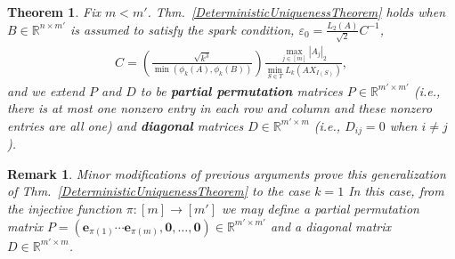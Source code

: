 \documentclass[journal, twocolumn]{IEEEtran}
\newtheorem{theorem}{Theorem}
\newtheorem{remark}{Remark}
\begin{document}
\begin{theorem}\label{DeterministicUniquenessTheorem2}
Fix $m < m'$.  Thm.~\ref{DeterministicUniquenessTheorem} holds when $B \in \mathbb{R}^{n \times m'}$ is assumed to satisfy the spark condition, $\varepsilon_0 = \frac{L_2(A)}{\sqrt{2}}  C^{-1}$, 
\begin{align}\label{Cdef'}
C= \left( \frac{ \sqrt{k^3}}{ \min(\phi_k(A), \phi_k(B)) } \right) \frac{\max_{j \in [m]} |A_j|_2}{\min_{S \in T} L_k(AX_{I(S)})},
\end{align}
and we extend $P$ and $D$ to be \textbf{partial permutation} matrices $P \in \mathbb{R}^{m' \times m'}$ (i.e., there is at most one nonzero entry in each row and column and these nonzero entries are all one) and \textbf{diagonal} matrices $D \in \mathbb{R}^{m' \times m}$ (i.e., $D_{ij} = 0$ when $i \neq j$).
%
\end{theorem}

\begin{remark}\label{m'geqmk=1}
Minor modifications of previous arguments prove this generalization of Thm.~\ref{DeterministicUniquenessTheorem} to the case $k=1$
In this case, from the injective function $\pi: [m] \rightarrow [m']$ we may define a partial permutation matrix $P = \left( \mathbf{e}_{\pi(1)} \cdots \mathbf{e}_{\pi(m)}, \mathbf{0}, \ldots, \mathbf{0} \right) \in \mathbb{R}^{m' \times m'}$ and a diagonal matrix $D \in \mathbb{R}^{m' \times m}$.
\end{remark}
\end{document}
